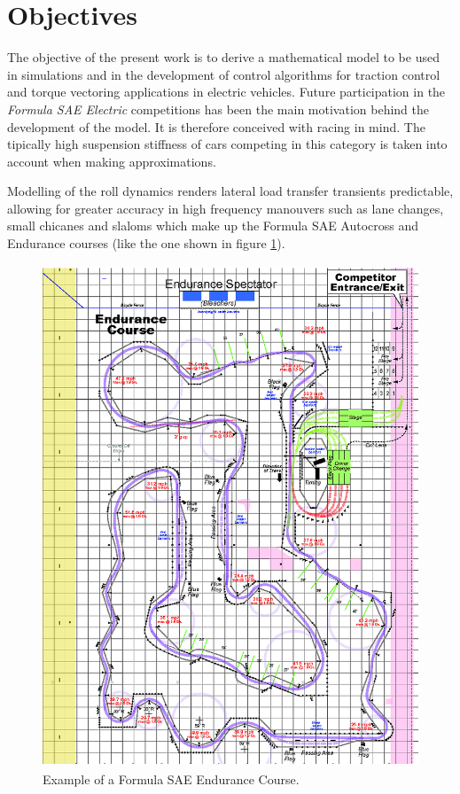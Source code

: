 \section{Objectives}
\label{sec:objectives}
The objective of the present work is to derive a mathematical model to be used  in simulations and in the development of control algorithms for traction control and torque vectoring applications in electric vehicles.
Future participation in the \textit{Formula SAE Electric} competitions has been the main motivation behind the development of the model. It is therefore conceived with racing in mind. The tipically high suspension stiffness of cars competing in this category is taken into account when making approximations.

Modelling of the roll dynamics renders lateral load transfer transients predictable, allowing for greater accuracy in high frequency manouvers such as lane changes, small chicanes and slaloms which make up the Formula SAE Autocross and Endurance courses (like the one shown in figure \ref{autox}).


\begin{figure}[tb]
  \centering
  \includegraphics[height=15cm]{images/autox}
  \caption{Example of a Formula SAE Endurance Course.}
  \label{autox}
\end{figure}

